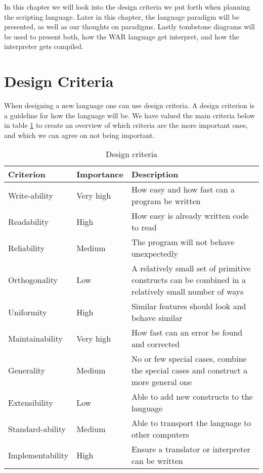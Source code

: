 In this chapter we will look into the design criteria we put forth when planning the scripting language. Later in this chapter, the language paradigm will be presented, as well as our thoughts on paradigms. Lastly tombstone diagrams will be used to present both, how the WAR language get interpret, and how the interpreter gets compiled.
\section{Design Criteria}\label{chap:DesCrit}
When designing a new language one can use design criteria. A design criterion is a guideline for how the language will be. 
We have valued the main criteria below in table \ref{tab:criteria_tabular} to create an overview of which criteria are the more important ones, and which we can agree on not being important.   

\begin{table}[H]
	\begin{tabular}{| 	l	|	 l	| p{7cm}	|}
	\hline
	Criterion			&	Importance	&		Description	\\	
	\hline
	Write-ability 		& 	Very high	&		How easy and how fast can a program be written\\
	Readability			& 	High		&		How easy is already written code to read\\
	Reliability			& 	Medium		&		The program will not behave unexpectedly\\
	Orthogonality		& 	Low			&		A relatively small set of primitive constructs can be combined in a relatively small number of ways\\
	Uniformity			& 	High		&		Similar features should look and behave similar\\
	Maintainability		& 	Very high	&		How fast can an error be found and corrected\\
	Generality			& 	Medium		&		No or few special cases, combine the special cases and construct a more general one\\
	Extensibility		& 	Low			&		Able to add new constructs to the language\\
	Standard-ability	& 	Medium		&		Able to transport the language to other computers\\
	Implementability	& 	High		&		Ensure a translator or interpreter can be written\\
	\hline
	\end{tabular}
	\caption{Design criteria \cite{criteria}}
	\label{tab:criteria_tabular}
\end{table}


